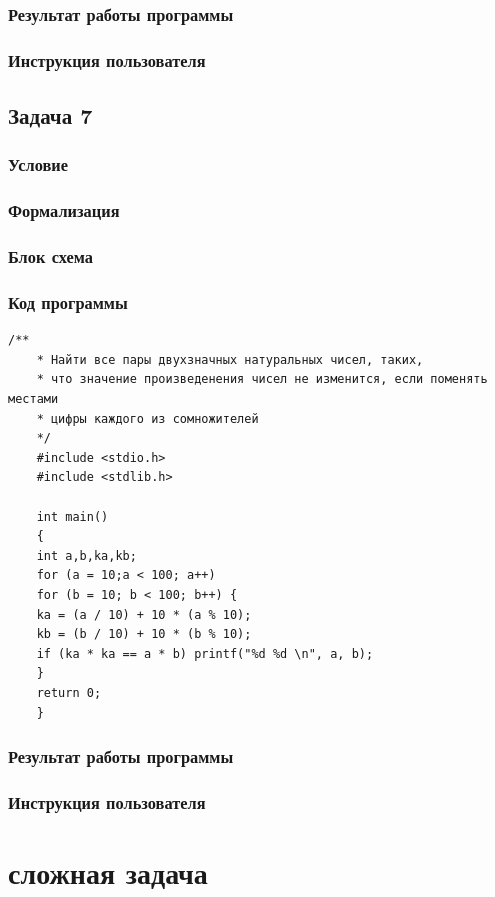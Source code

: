 \documentclass[simple,14pt]{eskdtext}
\begin{document}
	\subsubsection{Результат работы программы}
	\subsubsection{Инструкция пользователя}
	
	\subsection{Задача 7}
	\subsubsection{Условие}
	\subsubsection{Формализация}
	\subsubsection{Блок схема}
	\subsubsection{Код программы}
	\begin{lstlisting}[label=some-code3,caption=Задача 3]
	/**
	* Найти все пары двухзначных натуральных чисел, таких,
	* что значение произведенения чисел не изменится, если поменять местами
	* цифры каждого из сомножителей
	*/
	#include <stdio.h>
	#include <stdlib.h>
	
	int main()
	{
	int a,b,ka,kb;
	for (a = 10;a < 100; a++)
	for (b = 10; b < 100; b++) {
	ka = (a / 10) + 10 * (a % 10);
	kb = (b / 10) + 10 * (b % 10);
	if (ka * ka == a * b) printf("%d %d \n", a, b);
	}
	return 0;
	}
	\end{lstlisting}
	\subsubsection{Результат работы программы}
	\subsubsection{Инструкция пользователя}
	
	\newpage
	\section[СЛОЖНАЯ ЗАДАЧА]{сложная задача}
\end{document}
